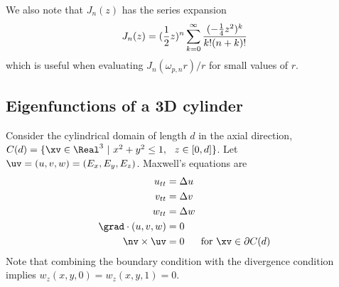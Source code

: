 \documentclass[10pt]{article}
\begin{document}
We also note that $J_n(z)$ has the series expansion
\[
   J_n(z) = ({1\over 2}z)^n \sum_{k=0}^\infty { (-{1\over 4} z^2)^k \over k! (n+k)! }
\]
which is useful when evaluating $J_n(\omega_{p,n} r )/r$ for small values of $r$.


\subsection{Eigenfunctions of a 3D cylinder}\label{sec:cylinderEigenfunctions}

Consider the cylindrical domain of length $d$ in the axial direction,
$C(d)=\{ \xv\in \Real^3 ~|~ x^2+y^2 \le 1,~~ z\in[0,d] \}$.
Let $\uv=(u,v,w)=(E_x,E_y,E_z)$. Maxwell's equations are
\begin{align*}
  u_{tt} & = \Delta u \\
  v_{tt} & = \Delta v \\
  w_{tt} & = \Delta w \\
  \grad\cdot (u,v,w) &= 0 \\
  \nv\times\uv&=0 ~~ \quad\mbox{for $\xv\in\partial C(d)$}
\end{align*}
Note that combining the boundary condition with the divergence condition implies
$w_z(x,y,0)=w_z(x,y,1)=0$.
\end{document}
